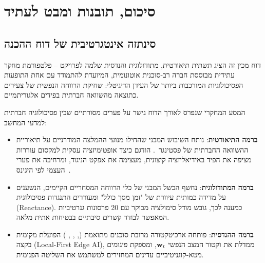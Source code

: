 \chapter{סיכום, תובנות ומבט לעתיד}
\label{chap:conclusion}

\section{סינתזה אינטגרטיבית של דוח ההכנה}
\label{sec:conclusion_synthesis}
דוח מכין זה הציג תשתית תיאורטית, מתודולוגית והנדסית שלמה לפרויקט \projectname{} -- פלטפורמת מחקר עתידית מבוססת חברה רב-סוכנית אוטונומית, המיועדת להתמודד עם אחת התופעות הפסיכולוגיות המורכבות ביותר של העידן הדיגיטלי: שחיקת הרווחה הנפשית של צעירים כתוצאה מהשוואה חברתית בפידים אלגוריתמיים.

המסע המחקרי שנפרס לאורך הדוח גישר על פערים מסורתיים שבין פסיכולוגיה חברתית למדעי המחשב:
\begin{itemize}
    \item \textbf{ברמה התיאורטית}: נותח השיבוש המבני שהחילו מנועי ההמלצה המודרניים על תיאוריית ההשוואה החברתית של פסטינגר~\cite{festinger1954theory}. הודגם כיצד אופטימיזציה עסקית למקסום עוררות מציפה את הפיד באידיאליזציה קיצונית, מעצימה את אפקט הניגוד, ומרחיבה את פערי העצמי לפי היגינס~\cite{higgins1987self}.
    \item \textbf{ברמה המתודולוגית}: נחשף הכשל המבני של כלי הרווחה המסחריים הקיימים, הנשענים על מדידה כמותית עיוורת של "זמן מסך כולל" ומעוררים התנגדות פסיכולוגית (\textenglish{Reactance}). כמענה לכך, גובש מודל סימולציה מבוקר עם 20 פרסונות גנרטיביות המאפשר לבודד קשרים סיבתיים בבטיחות אתית מלאה.
    \item \textbf{ברמה ההנדסית}: פותחה ארכיטקטורה מרובת סוכנים מתואמת (\agentObserver{}, \agentAnalyst{}, \agentReflector{}, \agentInterventionist{}) הפועלת מקומית בקצה (\textenglish{Local-First Edge AI}), ממדלת את וקטור המצב הנפשי $\mathbf{w}_t{}$, ומספקת פיגומים מטא-קוגניטיביים עדינים המחזירים למשתמש את השליטה הפנימית.
\end{itemize}

